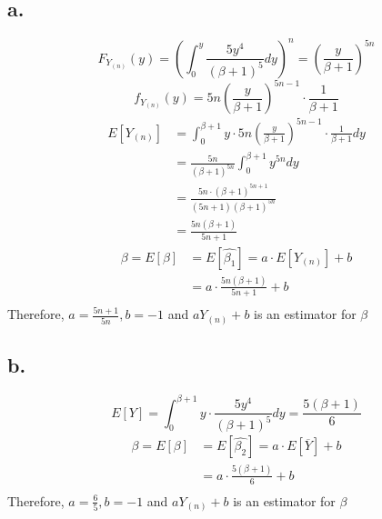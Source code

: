 \documentclass[11pt]{article}
\begin{document}
\subsection*{a.}
\[
    F_{Y_{(n)}}(y) = \left(\int_0^y \frac{5y^4}{(\beta+1)^5} dy \right)^n = \left( \frac{y}{\beta+1} \right)^{5n}
\]
\[
    f_{Y_{(n)}}(y) = 5n \left(\frac{y}{\beta+1} \right)^{5n-1} \cdot \frac{1}{\beta+1}
\]
\begin{equation*}
    \begin{aligned}
        E[Y_{(n)}]
        &= \int_0^{\beta+1} y \cdot 5n \left(\frac{y}{\beta+1} \right)^{5n-1} \cdot \frac{1}{\beta+1} dy \\
        &= \frac{5n}{(\beta+1)^{5n}} \int_0^{\beta+1} y^{5n} dy \\
        &= \frac{5n \cdot (\beta+1)^{5n+1}}{(5n+1)(\beta+1)^{5n}}\\
        &= \frac{5n (\beta+1)}{5n+1}
    \end{aligned}
\end{equation*}
\begin{equation*}
    \begin{aligned}
        \beta = E[\beta] &= E[\hat{\beta_1}] =  a \cdot E[Y_{(n)}] + b \\
        &= a \cdot \frac{5n (\beta+1)}{5n+1} + b \\
    \end{aligned}
\end{equation*}
Therefore, $a = \frac{5n+1}{5n}, b = -1$ and $aY_{(n)} + b$ is an estimator for $\beta$
\subsection*{b.}
\[
    E[Y] = \int_0^{\beta +1} y \cdot \frac{5y^4}{(\beta+1)^5} dy = \frac{5(\beta+1)}{6}
\]
\begin{equation*}
    \begin{aligned}
        \beta = E[\beta] &= E[\hat{\beta_2}] =  a \cdot E[\overline{Y}] + b \\
        &= a \cdot \frac{5 (\beta+1)}{6} + b \\
    \end{aligned}
\end{equation*}
Therefore, $a = \frac{6}{5}, b = -1$ and $aY_{(n)} + b$ is an estimator for $\beta$
\end{document}

